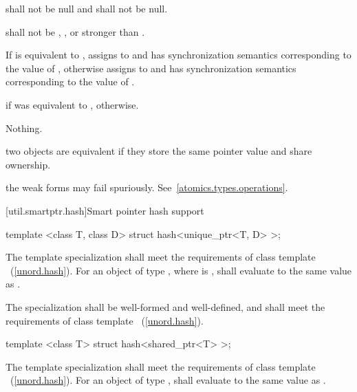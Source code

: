 \begin{itemdescr}
\pnum
\requires {} shall not be null and  shall not be null.

\pnum
\requires {} shall not be ,
, or stronger than .

\pnum
\effects If  is equivalent to , assigns  to
 and has synchronization semantics corresponding to the value of
, otherwise assigns  to  and has
synchronization semantics corresponding to the value of .

\pnum
\returns {} if  was equivalent to ,  otherwise.

\pnum
\throws Nothing.

\pnum
\remarks two  objects are equivalent if they store the same
pointer value and share ownership.

\pnum
\remarks the weak forms may fail spuriously. See~\ref{atomics.types.operations}.
\end{itemdescr}

[util.smartptr.hash]{Smart pointer hash support}

%
\begin{itemdecl}
template <class T, class D> struct hash<unique_ptr<T, D> >;
\end{itemdecl}

\begin{itemdescr}
\pnum The template specialization shall meet the requirements of class
template ~(\ref{unord.hash}). For an object  of type ,
where  is ,  shall evaluate to
the same value as .

\pnum
\requires The specialization  shall be
well-formed and well-defined, and shall meet the requirements of class
template ~(\ref{unord.hash}).
\end{itemdescr}

%
\begin{itemdecl}
template <class T> struct hash<shared_ptr<T> >;
\end{itemdecl}

\begin{itemdescr}
\pnum
The template specialization shall meet the requirements of class
template ~(\ref{unord.hash}). For an object  of type ,
 shall evaluate to
the same value as .
\end{itemdescr}%

